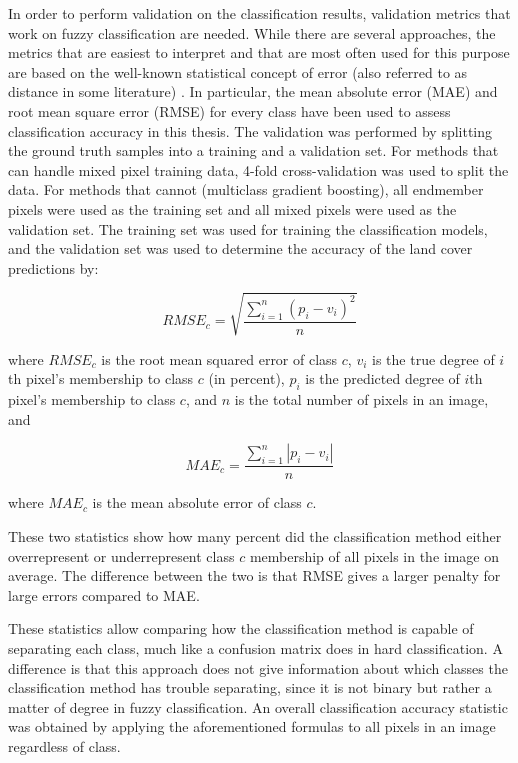 \documentclass[a4paper,12pt]{scrbook}
\begin{document}
In order to perform validation on the classification results, validation metrics that work on fuzzy classification are needed. While there are several approaches, the metrics that are easiest to interpret and that are most often used for this purpose are based on the well-known statistical concept of error (also referred to as distance in some literature) \citep{foody1996fuzzyevaluation}. In particular, the mean absolute error (MAE) and root mean square error (RMSE) for every class have been used to assess classification accuracy in this thesis. The validation was performed by splitting the ground truth samples into a training and a validation set. For methods that can handle mixed pixel training data, 4-fold cross-validation was used to split the data. For methods that cannot (multiclass gradient boosting), all endmember pixels were used as the training set and all mixed pixels were used as the validation set. The training set was used for training the classification models, and the validation set was used to determine the accuracy of the land cover predictions by:

$$ RMSE_c = \sqrt{ \frac{\displaystyle\sum_{i=1}^{n}{ (p_{i} - v_{i})^2 }}{n} } $$

where $ RMSE_c $ is the root mean squared error of class $ c $, $ v_{i} $ is the true degree of $ i $th pixel's membership to class $ c $ (in percent), $ p_i $ is the predicted degree of $ i $th pixel's membership to class $ c $, and $ n $ is the total number of pixels in an image, and

$$ MAE_c = \frac{\displaystyle\sum_{i=1}^{n}{ |p_{i} - v_{i}| }}{n} $$

where $ MAE_c $ is the mean absolute error of class $ c $.

These two statistics show how many percent did the classification method either overrepresent or underrepresent class $ c $ membership of all pixels in the image on average. The difference between the two is that RMSE gives a larger penalty for large errors compared to MAE.

These statistics allow comparing how the classification method is capable of separating each class, much like a confusion matrix does in hard classification. A difference is that this approach does not give information about which classes the classification method has trouble separating, since it is not binary but rather a matter of degree in fuzzy classification. An overall classification accuracy statistic was obtained by applying the aforementioned formulas to all pixels in an image regardless of class.
\end{document}
